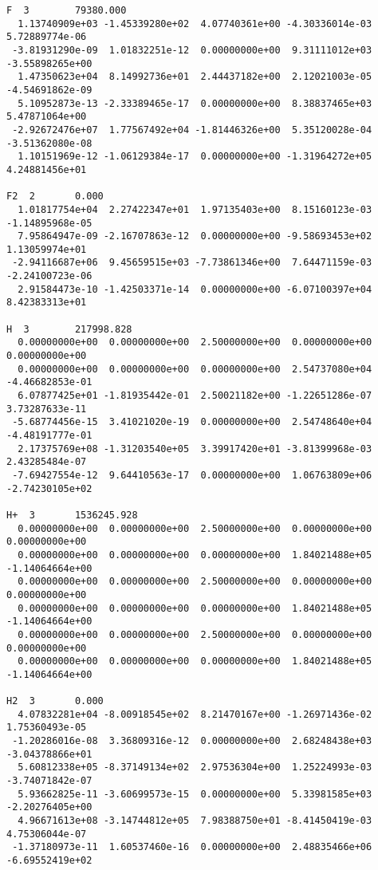 \begin{verbatim}
F  3		79380.000							 
  1.13740909e+03 -1.45339280e+02  4.07740361e+00 -4.30336014e-03  5.72889774e-06
 -3.81931290e-09  1.01832251e-12  0.00000000e+00  9.31111012e+03 -3.55898265e+00
  1.47350623e+04  8.14992736e+01  2.44437182e+00  2.12021003e-05 -4.54691862e-09
  5.10952873e-13 -2.33389465e-17  0.00000000e+00  8.38837465e+03  5.47871064e+00
 -2.92672476e+07  1.77567492e+04 -1.81446326e+00  5.35120028e-04 -3.51362080e-08
  1.10151969e-12 -1.06129384e-17  0.00000000e+00 -1.31964272e+05  4.24881456e+01
										 
F2  2		0.000								 
  1.01817754e+04  2.27422347e+01  1.97135403e+00  8.15160123e-03 -1.14895968e-05
  7.95864947e-09 -2.16707863e-12  0.00000000e+00 -9.58693453e+02  1.13059974e+01
 -2.94116687e+06  9.45659515e+03 -7.73861346e+00  7.64471159e-03 -2.24100723e-06
  2.91584473e-10 -1.42503371e-14  0.00000000e+00 -6.07100397e+04  8.42383313e+01
										 
H  3		217998.828							 
  0.00000000e+00  0.00000000e+00  2.50000000e+00  0.00000000e+00  0.00000000e+00
  0.00000000e+00  0.00000000e+00  0.00000000e+00  2.54737080e+04 -4.46682853e-01
  6.07877425e+01 -1.81935442e-01  2.50021182e+00 -1.22651286e-07  3.73287633e-11
 -5.68774456e-15  3.41021020e-19  0.00000000e+00  2.54748640e+04 -4.48191777e-01
  2.17375769e+08 -1.31203540e+05  3.39917420e+01 -3.81399968e-03  2.43285484e-07
 -7.69427554e-12  9.64410563e-17  0.00000000e+00  1.06763809e+06 -2.74230105e+02
										 
H+  3		1536245.928							 
  0.00000000e+00  0.00000000e+00  2.50000000e+00  0.00000000e+00  0.00000000e+00
  0.00000000e+00  0.00000000e+00  0.00000000e+00  1.84021488e+05 -1.14064664e+00
  0.00000000e+00  0.00000000e+00  2.50000000e+00  0.00000000e+00  0.00000000e+00
  0.00000000e+00  0.00000000e+00  0.00000000e+00  1.84021488e+05 -1.14064664e+00
  0.00000000e+00  0.00000000e+00  2.50000000e+00  0.00000000e+00  0.00000000e+00
  0.00000000e+00  0.00000000e+00  0.00000000e+00  1.84021488e+05 -1.14064664e+00
										 
H2  3		0.000								 
  4.07832281e+04 -8.00918545e+02  8.21470167e+00 -1.26971436e-02  1.75360493e-05
 -1.20286016e-08  3.36809316e-12  0.00000000e+00  2.68248438e+03 -3.04378866e+01
  5.60812338e+05 -8.37149134e+02  2.97536304e+00  1.25224993e-03 -3.74071842e-07
  5.93662825e-11 -3.60699573e-15  0.00000000e+00  5.33981585e+03 -2.20276405e+00
  4.96671613e+08 -3.14744812e+05  7.98388750e+01 -8.41450419e-03  4.75306044e-07
 -1.37180973e-11  1.60537460e-16  0.00000000e+00  2.48835466e+06 -6.69552419e+02
										 

\end{verbatim}
